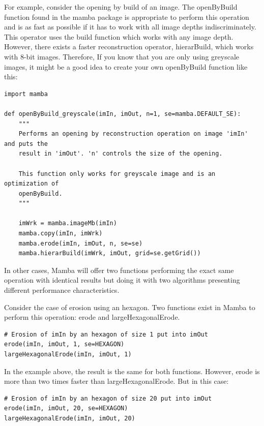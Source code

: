 \documentclass[a4paper,10pt,oneside]{article}
\begin{document}
For example, consider the opening by build of an image. The openByBuild function
found in the mamba package is appropriate to perform this operation and
is as fast as possible if it has to work with all image depths indiscriminately.
This operator uses the build function which works with any image
depth. However, there exists a faster reconstruction operator,
hierarBuild, which works with 8-bit images. Therefore, If you know that you are
only using greyscale images, it might be a good idea to create your own openByBuild
function like this:

\lstset{language=Python}
\begin{lstlisting}
import mamba

def openByBuild_greyscale(imIn, imOut, n=1, se=mamba.DEFAULT_SE):
    """
    Performs an opening by reconstruction operation on image 'imIn' and puts the
    result in 'imOut'. 'n' controls the size of the opening.
    
    This function only works for greyscale image and is an optimization of
    openByBuild.
    """
    
    imWrk = mamba.imageMb(imIn)
    mamba.copy(imIn, imWrk)
    mamba.erode(imIn, imOut, n, se=se)
    mamba.hierarBuild(imWrk, imOut, grid=se.getGrid())
\end{lstlisting}

In other cases, Mamba will offer two functions performing the exact same 
operation with identical results but doing it with two algorithms presenting
different performance characteristics.

Consider the case of erosion using an hexagon. Two functions exist in Mamba to
perform this operation: erode and largeHexagonalErode.

\lstset{language=Python}
\begin{lstlisting}
# Erosion of imIn by an hexagon of size 1 put into imOut
erode(imIn, imOut, 1, se=HEXAGON)
largeHexagonalErode(imIn, imOut, 1)
\end{lstlisting}

In the example above, the result is the same for both functions. However, erode is
more than two times faster than largeHexagonalErode. But in this case:

\lstset{language=Python}
\begin{lstlisting}
# Erosion of imIn by an hexagon of size 20 put into imOut
erode(imIn, imOut, 20, se=HEXAGON)
largeHexagonalErode(imIn, imOut, 20)
\end{lstlisting}
\end{document}
